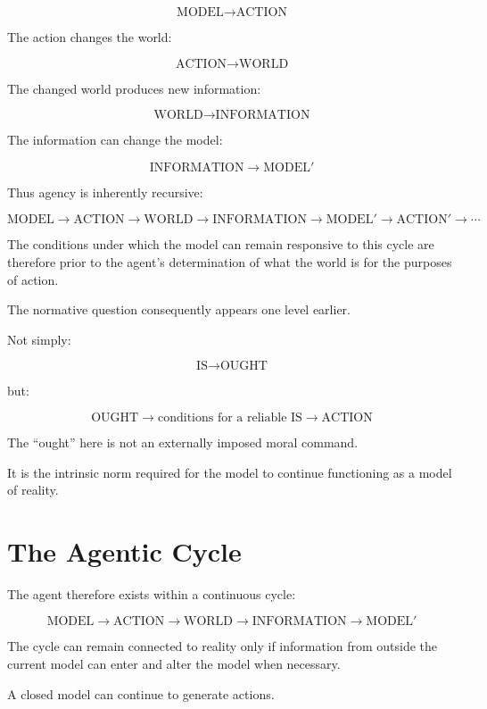 \documentclass[11pt,a4paper]{article}
\begin{document}
\[
\text{MODEL} \rightarrow \text{ACTION}
\]

The action changes the world:

\[
\text{ACTION} \rightarrow \text{WORLD}
\]

The changed world produces new information:

\[
\text{WORLD} \rightarrow \text{INFORMATION}
\]

The information can change the model:

\[
\text{INFORMATION} \rightarrow \text{MODEL}'
\]

Thus agency is inherently recursive:

\[
\boxed{
\text{MODEL}
\rightarrow
\text{ACTION}
\rightarrow
\text{WORLD}
\rightarrow
\text{INFORMATION}
\rightarrow
\text{MODEL}'
\rightarrow
\text{ACTION}'
\rightarrow \cdots
}
\]

The conditions under which the model can remain responsive to this cycle
are therefore prior to the agent's determination of what the world is for
the purposes of action.

The normative question consequently appears one level earlier.

Not simply:

\[
\text{IS} \rightarrow \text{OUGHT}
\]

but:

\[
\boxed{
\text{OUGHT}
\rightarrow
\text{conditions for a reliable IS}
\rightarrow
\text{ACTION}
}
\]

The ``ought'' here is not an externally imposed moral command.

It is the intrinsic norm required for the model to continue functioning as a
model of reality.


\section{The Agentic Cycle}

The agent therefore exists within a continuous cycle:

\[
\boxed{
\text{MODEL}
\rightarrow
\text{ACTION}
\rightarrow
\text{WORLD}
\rightarrow
\text{INFORMATION}
\rightarrow
\text{MODEL}'
}
\]

The cycle can remain connected to reality only if information from outside
the current model can enter and alter the model when necessary.

A closed model can continue to generate actions.
\end{document}

